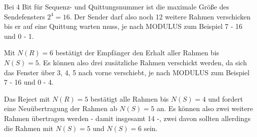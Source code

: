 \documentclass{../exercisesheet}
\begin{document}
\begin{exercise}{1.5}
\begin{subexercise}
	Bei 4 Bit für Sequenz- und Quittungsnummer ist die maximale Größe des Sendefensters $2^4 = 16$. Der Sender darf also noch 12 weitere Rahmen verschicken bis er auf eine Quittung warten muss, je nach MODULUS zum Beispiel 7 - 16 und 0 - 1.
\end{subexercise}
\begin{subexercise}
	Mit $N(R) = 6$ bestätigt der Empfänger den Erhalt aller Rahmen bis $N(S) = 5$. Es können also drei zusätzliche Rahmen verschickt werden, da sich das Fenster über 3, 4, 5 nach vorne verschiebt, je nach MODULUS zum Beispiel 7 - 16 und 0 - 4.
\end{subexercise}
\begin{subexercise}
	Das Reject mit $N(R) = 5$ bestätigt alle Rahmen bis $N(S) = 4$ und fordert eine Neuübertragung der Rahmen ab $N(S) = 5$ an. Es können also zwei weitere Rahmen übertragen werden - damit insgesamt 14 -, zwei davon sollten allerdings die Rahmen mit $N(S) = 5$ und $N(S) = 6$ sein.
\end{subexercise}
\end{exercise}
\end{document}
